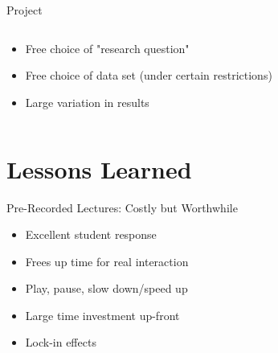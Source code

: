 \begin{frame}{Project}
  \begin{columns}[c,onlytextwidth]
    \begin{column}{0.8\linewidth}
      \begin{itemize}
        \item Free choice of "research question"
        \item Free choice of data set (under certain restrictions)
        \item Large variation in results
      \end{itemize}
    \end{column}
    \begin{column}{0.2\linewidth}
    \end{column}
  \end{columns}
\end{frame}

\section{Lessons Learned}

\begin{frame}{Pre-Recorded Lectures: Costly but Worthwhile}
  \begin{itemize}
    \item Excellent student response
    \item Frees up time for real interaction
    \item Play, pause, slow down/speed up
    \item Large time investment up-front
    \item Lock-in effects
  \end{itemize}
\end{frame}

